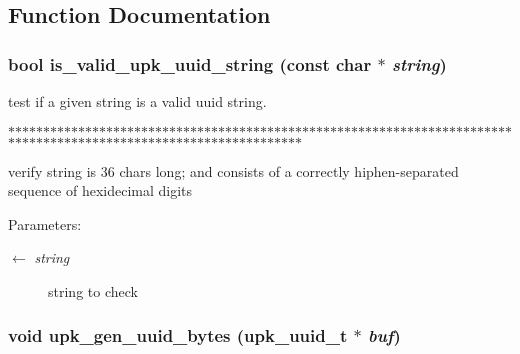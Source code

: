 \subsection{Function Documentation}
\subsubsection{\setlength{\rightskip}{0pt plus 5cm}bool is\_\-valid\_\-upk\_\-uuid\_\-string (const char $\ast$ {\em string})}\label{group__uuid__functions_g5a4168d12711c8db01d4ea06b473649c}


test if a given string is a valid uuid string. 

$\ast$$\ast$$\ast$$\ast$$\ast$$\ast$$\ast$$\ast$$\ast$$\ast$$\ast$$\ast$$\ast$$\ast$$\ast$$\ast$$\ast$$\ast$$\ast$$\ast$$\ast$$\ast$$\ast$$\ast$$\ast$$\ast$$\ast$$\ast$$\ast$$\ast$$\ast$$\ast$$\ast$$\ast$$\ast$$\ast$$\ast$$\ast$$\ast$$\ast$$\ast$$\ast$$\ast$$\ast$$\ast$$\ast$$\ast$$\ast$$\ast$$\ast$$\ast$$\ast$$\ast$$\ast$$\ast$$\ast$$\ast$$\ast$$\ast$$\ast$$\ast$$\ast$$\ast$$\ast$$\ast$$\ast$$\ast$$\ast$$\ast$$\ast$$\ast$$\ast$$\ast$$\ast$$\ast$$\ast$$\ast$$\ast$$\ast$$\ast$$\ast$$\ast$$\ast$$\ast$$\ast$$\ast$$\ast$$\ast$$\ast$$\ast$$\ast$$\ast$$\ast$$\ast$$\ast$$\ast$$\ast$$\ast$$\ast$$\ast$$\ast$$\ast$$\ast$$\ast$$\ast$$\ast$$\ast$$\ast$$\ast$$\ast$$\ast$$\ast$$\ast$$\ast$

verify string is 36 chars long; and consists of a correctly hiphen-separated sequence of hexidecimal digits

\begin{Desc}
\item[Parameters:]
\begin{description}
\item[\mbox{$\leftarrow$} {\em string}]string to check \end{description}
\end{Desc}
\subsubsection{\setlength{\rightskip}{0pt plus 5cm}void upk\_\-gen\_\-uuid\_\-bytes (\bf{upk\_\-uuid\_\-t} $\ast$ {\em buf})}\label{group__uuid__functions_gd5fac158e8d20220955a0d338de8a66f}


